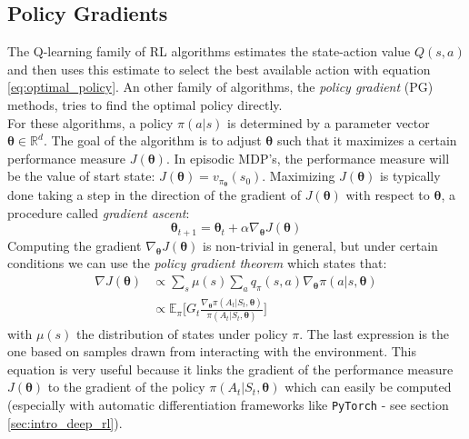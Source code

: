 \subsection{Policy Gradients}
\label{sec:intro_policy_grads}
The Q-learning family of RL algorithms estimates the state-action value $Q(s,a)$ and then uses this estimate to select the best available action with equation \ref{eq:optimal_policy}. An other family of algorithms, the \emph{policy gradient} (PG) methods, tries to find the optimal policy directly.\\

For these algorithms, a policy $\pi(a|s)$ is determined by a parameter vector $\bm{\theta} \in \mathbb{R}^d$. The goal of the algorithm is to adjust $\bm{\theta}$ such that it maximizes a certain performance measure $J(\bm{\theta})$. In episodic MDP's, the performance measure will be the value of start state: $J(\bm{\theta}) = v_{\pi_{\bm{\theta}}}(s_0)$. Maximizing $J(\bm{\theta})$ is typically done taking a step in the direction of the gradient of  $J(\bm{\theta})$ with respect to $\bm{\theta}$, a procedure called \emph{gradient ascent}:
\begin{equation}
    \label{eqn:grad_ascent}
    \bm{\theta}_{t+1} = \bm{\theta}_{t} + \alpha \nabla_{\bm{\theta}} J(\bm{\theta})
\end{equation}
Computing the gradient $\nabla_{\bm{\theta}} J(\bm{\theta})$ is non-trivial in general, but under certain conditions we can use the \emph{policy gradient theorem} which states that:
\begin{equation}
    \begin{split}
    \nabla J(\bm{\theta}) &\propto \sum_{s} \mu(s) \sum_{a} q_{\pi}(s,a) \nabla_{\bm{\theta}} \pi(a|s, \bm{\theta})\\
                          &\propto \mathbb{E}_{\pi} \Big [ G_t \frac{\nabla_{\bm{\theta}} \pi(A_t|S_t, \bm{\theta})}{\pi(A_t|S_t, \bm{\theta})}\Big]
    \end{split}
    \label{eqn:pol_grad_theorem}
\end{equation}
with $\mu(s)$ the distribution of states under policy $\pi$. The last expression is the one based on samples drawn from interacting with the environment. This equation is very useful because it links the gradient of the performance measure $J(\bm{\theta})$ to the gradient of the policy $\pi(A_t|S_t, \bm{\theta})$ which can easily be computed (especially with automatic differentiation frameworks like {\tt PyTorch} - see section \ref{sec:intro_deep_rl}).\\


